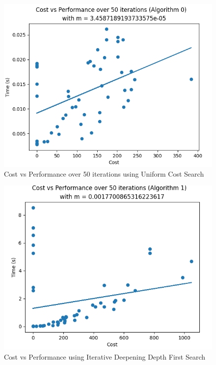 \documentclass[a4paper]{article}
\begin{document}
\begin{figure}[ht]
    \centering
    \includegraphics[width=\textwidth]{CVPALG0.png}
    \caption{Cost vs Performance over 50 iterations using Uniform Cost Search}
    \label{fig:CostVsPerformanceAlg0}
\end{figure}
\newpage
\begin{figure}[ht]
    \centering
    \includegraphics[width=\textwidth]{CVPALG1.png}
    \caption{Cost vs Performance using Iterative Deepening Depth First Search}
    \label{fig:CostVsPerformanceAlg1}
\end{figure}
\end{document}
